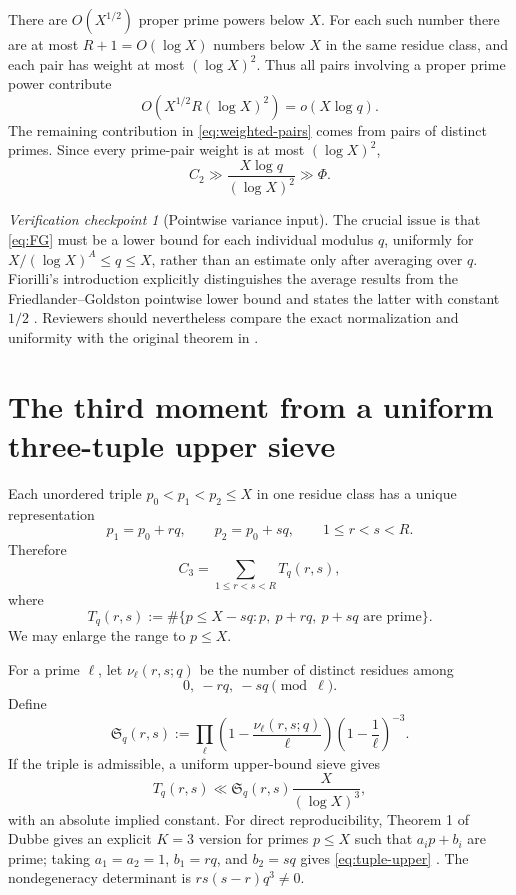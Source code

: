 \documentclass[11pt]{article}
\theoremstyle{definition}
\theoremstyle{remark}
\newtheorem{checkpoint}[theorem]{Verification checkpoint}
\newcommand{\Ss}{\mathfrak S}
\begin{document}
There are $O(X^{1/2})$ proper prime powers below $X$.
For each such number there are at most $R+1=O(\log X)$ numbers below $X$ in the same residue class, and each pair has weight at most $(\log X)^2$.
Thus all pairs involving a proper prime power contribute
\[
  O\!\left(X^{1/2}R(\log X)^2\right)=o(X\log q).
\]
The remaining contribution in \eqref{eq:weighted-pairs} comes from pairs of distinct primes.
Since every prime-pair weight is at most $(\log X)^2$,
\begin{equation}\label{eq:C2}
  C_2\gg \frac{X\log q}{(\log X)^2}\gg\Phi.
\end{equation}

\begin{checkpoint}[Pointwise variance input]\label{check:variance}
The crucial issue is that \eqref{eq:FG} must be a lower bound for each individual modulus $q$, uniformly for $X/(\log X)^A\le q\le X$, rather than an estimate only after averaging over $q$.
Fiorilli's introduction explicitly distinguishes the average results from the Friedlander--Goldston pointwise lower bound and states the latter with constant $1/2$ \cite{Fiorilli2015}.
Reviewers should nevertheless compare the exact normalization and uniformity with the original theorem in \cite{FriedlanderGoldston1996}.
\end{checkpoint}

\section{The third moment from a uniform three-tuple upper sieve}

Each unordered triple $p_0<p_1<p_2\le X$ in one residue class has a unique representation
\[
  p_1=p_0+rq,\qquad p_2=p_0+sq,
  \qquad 1\le r<s<R.
\]
Therefore
\begin{equation}\label{eq:C3-shifts}
  C_3=\sum_{1\le r<s<R}T_q(r,s),
\end{equation}
where
\[
  T_q(r,s):=
  \#\{p\le X-sq:p,\ p+rq,\ p+sq\text{ are prime}\}.
\]
We may enlarge the range to $p\le X$.

For a prime $\ell$, let $\nu_\ell(r,s;q)$ be the number of distinct residues among
\[
  0,\ -rq,\ -sq\pmod\ell.
\]
Define
\begin{equation}\label{eq:singular-series}
  \Ss_q(r,s):=
  \prod_{\ell}
  \left(1-\frac{\nu_\ell(r,s;q)}{\ell}\right)
  \left(1-\frac1\ell\right)^{-3}.
\end{equation}
If the triple is admissible, a uniform upper-bound sieve gives
\begin{equation}\label{eq:tuple-upper}
  T_q(r,s)\ll \Ss_q(r,s)\frac{X}{(\log X)^3},
\end{equation}
with an absolute implied constant.
For direct reproducibility, Theorem 1 of Dubbe gives an explicit $K=3$ version for primes $p\le X$ such that $a_i p+b_i$ are prime; taking $a_1=a_2=1$, $b_1=rq$, and $b_2=sq$ gives \eqref{eq:tuple-upper} \cite{Dubbe2024}.
The nondegeneracy determinant is $r s(s-r)q^3\ne0$.
\end{document}
